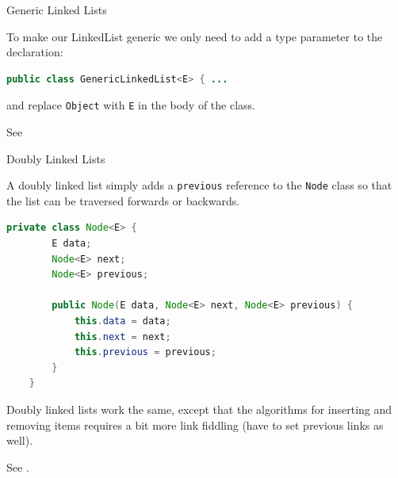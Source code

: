 \documentclass{beamer}
\begin{document}
\begin{frame}[fragile]{Generic Linked Lists}


To make our LinkedList generic we only need to add a type parameter to the declaration:
\begin{lstlisting}[language=Java]
public class GenericLinkedList<E> { ...
\end{lstlisting}

and replace {\tt Object} with {\tt E} in the body of the class.

See 

\end{frame}

\begin{frame}[fragile]{Doubly Linked Lists}


A doubly linked list simply adds a {\tt previous} reference to the {\tt Node} class so that the list can be traversed forwards or backwards.
\begin{lstlisting}[language=Java]
    private class Node<E> {
        E data;
        Node<E> next;
        Node<E> previous;

        public Node(E data, Node<E> next, Node<E> previous) {
            this.data = data;
            this.next = next;
            this.previous = previous;
        }
    }
\end{lstlisting}

Doubly linked lists work the same, except that the algorithms for inserting and removing items requires a bit more link fiddling (have to set previous links as well).

See .

\end{frame}
\end{document}
